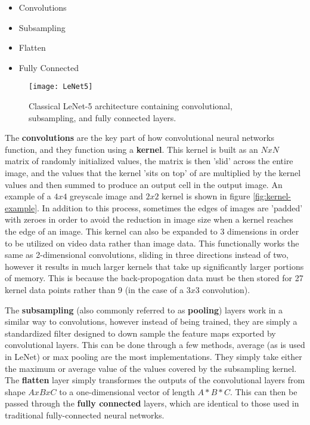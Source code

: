 \begin{itemize}
	\item Convolutions
	\item Subsampling
	\item Flatten
	\item Fully Connected
\end{itemize}

\begin{figure}[ht]
	\texttt{[image: LeNet5]}
	\centering
	\caption{Classical LeNet-5 architecture \cite{lenet5} containing convolutional, subsampling, and fully connected layers.}
	\label{fig:lenet5}
\end{figure}

The \textbf{convolutions} are the key part of how convolutional neural networks function, and they function using a \textbf{kernel}. This kernel is built as an $NxN$ matrix of randomly initialized values, the matrix is then 'slid' across the entire image, and the values that the kernel 'sits on top' of are multiplied by the kernel values and then summed to produce an output cell in the output image. An example of a $4x4$ greyscale image and $2x2$ kernel is shown in figure \ref{fig:kernel-example}. In addition to this process, sometimes the edges of images are 'padded' with zeroes in order to avoid the reduction in image size when a kernel reaches the edge of an image. This kernel can also be expanded to 3 dimensions in order to be utilized on video data rather than image data. This functionally works the same as 2-dimensional convolutions, sliding in three directions instead of two, however it results in much larger kernels that take up significantly larger portions of memory. This is because the back-propogation data must be then stored for 27 kernel data points rather than 9 (in the case of a $3x3$ convolution).

The \textbf{subsampling} (also commonly referred to as \textbf{pooling}) layers work in a similar way to convolutions, however instead of being trained, they are simply a standardized filter designed to down sample the feature maps exported by convolutional layers. This can be done through a few methods, average (as is used in LeNet) or max pooling are the most implementations. They simply take either the maximum or average value of the values covered by the subsampling kernel. The \textbf{flatten} layer simply transformes the outputs of the convolutional layers from shape $AxBxC$ to a one-dimensional vector of length $A*B*C$. This can then be passed through the \textbf{fully connected} layers, which are identical to those used in traditional fully-connected neural networks.

